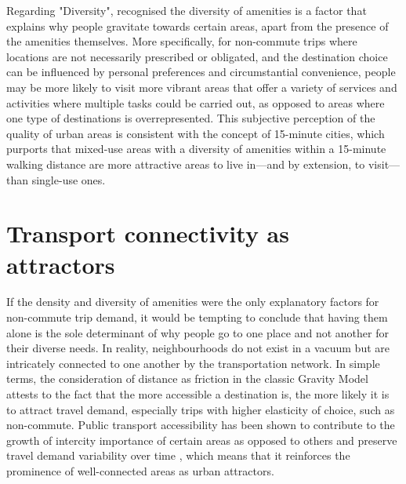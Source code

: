 Regarding "Diversity", \citet{cerveroTravelDemand3Ds1997} recognised the diversity of amenities is a factor that explains why people gravitate towards certain areas, apart from the presence of the amenities themselves. More specifically, for non-commute trips where locations are not necessarily prescribed or obligated, and the destination choice can be influenced by personal preferences and circumstantial convenience, people may be more likely to visit more vibrant areas that offer a variety of services and activities where multiple tasks could be carried out, as opposed to areas where one type of destinations is overrepresented. This subjective perception of the quality of urban areas is consistent with the concept of 15-minute cities, which purports that mixed-use areas with a diversity of amenities within a 15-minute walking distance are more attractive areas to live in---and by extension, to visit---than single-use ones. \citep{khavarian-garmsirGardenCity15Minute2023}

\section{Transport connectivity as attractors}

If the density and diversity of amenities were the only explanatory factors for non-commute trip demand, it would be tempting to conclude that having them alone is the sole determinant of why people go to one place and not another for their diverse needs. In reality, neighbourhoods do not exist in a vacuum but are intricately connected to one another by the transportation network. In simple terms, the consideration of distance as friction in the classic Gravity Model attests to the fact that the more accessible a destination is, the more likely it is to attract travel demand, especially trips with higher elasticity of choice, such as non-commute. Public transport accessibility has been shown to contribute to the growth of intercity importance of certain areas as opposed to others and preserve travel demand variability over time \citep{zhongMeasuringVariabilityMobility2015}, which means that it reinforces the prominence of well-connected areas as urban attractors. 

